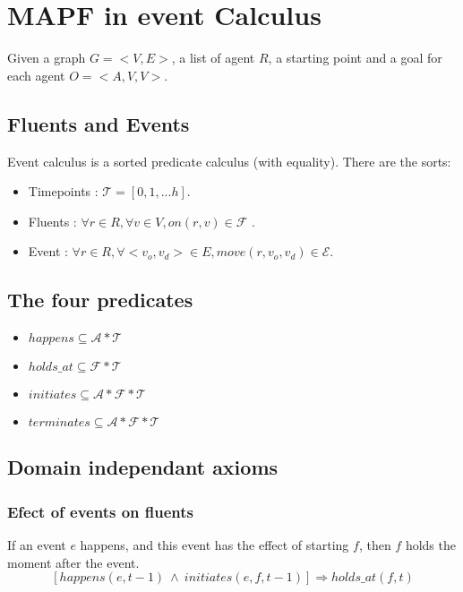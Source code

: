 \section{MAPF in event Calculus}\label{sec:introduction}

Given a graph $G = <V,E>$, a list of agent $R$, a starting point and a goal for each agent $O = <A,V,V>$.

\subsection{Fluents and Events}

Event calculus is a sorted predicate calculus (with equality). There are the sorts:

\begin{itemize}
  \item Timepoints : $\mathcal{T} = [0, 1, ... h]$.
  \item Fluents : $\forall r \in R, \forall v \in V, on(r,v) \in \mathcal{F}$ .
  \item Event : $\forall r \in R, \forall <v_o,v_d> \in E, move(r,v_o,v_d) \in \mathcal{E}$.
\end{itemize}

\subsection{The four predicates}

\begin{itemize}
  \item $happens \subseteq \mathcal{A}*\mathcal{T}$
  \item $holds\_at \subseteq \mathcal{F}*\mathcal{T}$
  \item $initiates \subseteq \mathcal{A}*\mathcal{F}*\mathcal{T}$
  \item $terminates \subseteq \mathcal{A}*\mathcal{F}*\mathcal{T}$
\end{itemize}

\subsection{Domain independant axioms}

\subsubsection{Efect of events on fluents}

If an event $e$ happens, and this event has the effect of starting $f$, then $f$ holds the moment after the event.
\begin{equation}
  \tag{E.1}
  [happens(e,t-1)\ \land\ initiates(e,f,t-1)] \Rightarrow holds\_at(f,t)
\end{equation}

